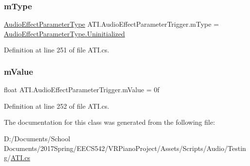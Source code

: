 \mbox{\label{class_a_t_i_1_1_audio_effect_parameter_trigger_ac2ca110ecb26468c2c9fde094a1e5bd7}} 
\subsubsection{\texorpdfstring{m\+Type}{mType}}
{\footnotesize\ttfamily \hyperlink{class_a_t_i_a1123d61b8dceb5867a3683e8d2224ee1}{Audio\+Effect\+Parameter\+Type} A\+T\+I.\+Audio\+Effect\+Parameter\+Trigger.\+m\+Type = \hyperlink{class_a_t_i_a1123d61b8dceb5867a3683e8d2224ee1af704f57ea420275ad51bf55b7dec2c96}{Audio\+Effect\+Parameter\+Type.\+Uninitialized}\hspace{0.3cm}{\ttfamily [private]}}



Definition at line 251 of file A\+T\+I.\+cs.

\mbox{\label{class_a_t_i_1_1_audio_effect_parameter_trigger_ad123c432e1decb6410707940ab7383e6}} 
\subsubsection{\texorpdfstring{m\+Value}{mValue}}
{\footnotesize\ttfamily float A\+T\+I.\+Audio\+Effect\+Parameter\+Trigger.\+m\+Value = 0f\hspace{0.3cm}{\ttfamily [private]}}



Definition at line 252 of file A\+T\+I.\+cs.



The documentation for this class was generated from the following file\+:\begin{DoxyCompactItemize}
\item 
D\+:/\+Documents/\+School Documents/2017\+Spring/\+E\+E\+C\+S542/\+V\+R\+Piano\+Project/\+Assets/\+Scripts/\+Audio/\+Testing/\hyperlink{_a_t_i_8cs}{A\+T\+I.\+cs}\end{DoxyCompactItemize}
